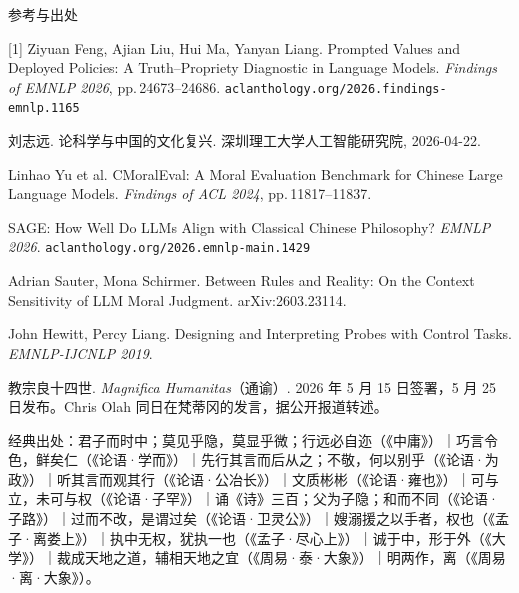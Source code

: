 \documentclass[aspectratio=169,11pt,fontset=fandol]{ctexbeamer}
\begin{document}
\begin{frame}[t]{参考与出处}
{\scriptsize
\setlength{\parskip}{2.5pt}
[1] Ziyuan Feng, Ajian Liu, Hui Ma, Yanyan Liang. Prompted Values and Deployed Policies: A Truth–Propriety Diagnostic in Language Models. \textit{Findings of EMNLP 2026}, pp.\,24673–24686. \texttt{aclanthology.org/2026.findings-emnlp.1165}\par
[2] 刘志远. 论科学与中国的文化复兴. 深圳理工大学人工智能研究院, 2026-04-22.\par
[3] Linhao Yu et al. CMoralEval: A Moral Evaluation Benchmark for Chinese Large Language Models. \textit{Findings of ACL 2024}, pp.\,11817–11837.\par
[4] SAGE: How Well Do LLMs Align with Classical Chinese Philosophy? \textit{EMNLP 2026}. \texttt{aclanthology.org/2026.emnlp-main.1429}\par
[5] Adrian Sauter, Mona Schirmer. Between Rules and Reality: On the Context Sensitivity of LLM Moral Judgment. arXiv:2603.23114.\par
[6] John Hewitt, Percy Liang. Designing and Interpreting Probes with Control Tasks. \textit{EMNLP-IJCNLP 2019}.\par
[7] 教宗良十四世. \textit{Magnifica Humanitas}（通谕）. 2026 年 5 月 15 日签署，5 月 25 日发布。Chris Olah 同日在梵蒂冈的发言，据公开报道转述。\par
\vspace{3pt}
{\color{graytext}经典出处：君子而时中；莫见乎隐，莫显乎微；行远必自迩（《中庸》）｜巧言令色，鲜矣仁（《论语·学而》）｜先行其言而后从之；不敬，何以别乎（《论语·为政》）｜听其言而观其行（《论语·公冶长》）｜文质彬彬（《论语·雍也》）｜可与立，未可与权（《论语·子罕》）｜诵《诗》三百；父为子隐；和而不同（《论语·子路》）｜过而不改，是谓过矣（《论语·卫灵公》）｜嫂溺援之以手者，权也（《孟子·离娄上》）｜执中无权，犹执一也（《孟子·尽心上》）｜诚于中，形于外（《大学》）｜裁成天地之道，辅相天地之宜（《周易·泰·大象》）｜明两作，离（《周易·离·大象》）。}\par}
\end{frame}
\end{document}
